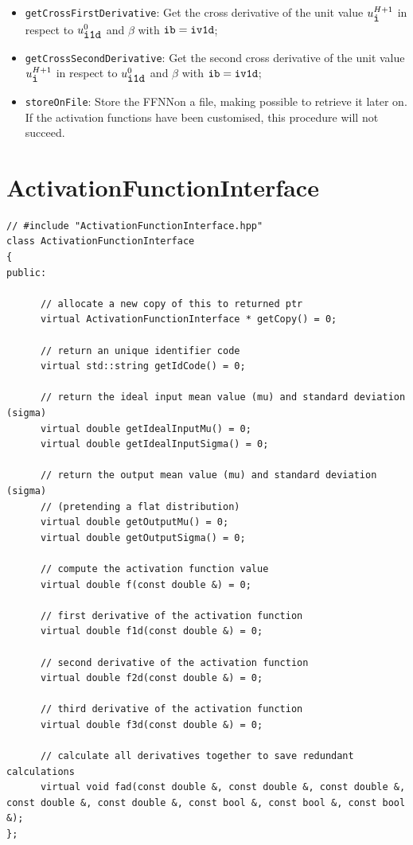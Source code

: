 \documentclass[11pt,a4paper,twoside]{article}
\begin{document}
\begin{itemize}
\item \verb+getCrossFirstDerivative+: Get the cross derivative of the unit value $u^{H+1}_{\verb+i+}$ in respect to $u^0_{\verb+i1d+}$ and $\beta$ with $\verb+ib+ = \verb+iv1d+$;
\item \verb+getCrossSecondDerivative+: Get the second cross derivative of the unit value $u^{H+1}_{\verb+i+}$ in respect to $u^0_{\verb+i1d+}$ and $\beta$ with $\verb+ib+ = \verb+iv1d+$;
\item \verb+storeOnFile+: Store the FFNNon a file, making possible to retrieve it later on. If the activation functions have been customised, this procedure will not succeed.
\end{itemize}


\section{ActivationFunctionInterface} %
\label{sec:activationfunctioninterface}

\begin{lstlisting}
// #include "ActivationFunctionInterface.hpp"
class ActivationFunctionInterface
{
public:

      // allocate a new copy of this to returned ptr
      virtual ActivationFunctionInterface * getCopy() = 0;

      // return an unique identifier code
      virtual std::string getIdCode() = 0;

      // return the ideal input mean value (mu) and standard deviation (sigma)
      virtual double getIdealInputMu() = 0;
      virtual double getIdealInputSigma() = 0;

      // return the output mean value (mu) and standard deviation (sigma)
      // (pretending a flat distribution)
      virtual double getOutputMu() = 0;
      virtual double getOutputSigma() = 0;

      // compute the activation function value
      virtual double f(const double &) = 0;

      // first derivative of the activation function
      virtual double f1d(const double &) = 0;

      // second derivative of the activation function
      virtual double f2d(const double &) = 0;

      // third derivative of the activation function
      virtual double f3d(const double &) = 0;

      // calculate all derivatives together to save redundant calculations
      virtual void fad(const double &, const double &, const double &, const double &, const double &, const bool &, const bool &, const bool &);
};
\end{lstlisting}
\end{document}
